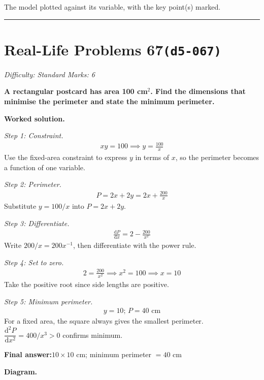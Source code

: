 \documentclass[11pt]{article}
\newcommand{\question}[1]{\par\medskip\noindent\textbf{#1}\par}
\begin{document}
\small The model plotted against its variable, with the key point(s) marked.\normalsize

\medskip\hrule

\section*{Real-Life Problems 67\quad\small\texttt{(d5-067)}}
\textit{Difficulty: Standard \quad\textbar\quad Marks: 6}

\question{A rectangular postcard has area 100 cm\(^2\). Find the dimensions that minimise the perimeter and state the minimum perimeter.}

\textbf{Worked solution.}

\textit{Step 1: Constraint.}
\[\begin{gathered}
xy = 100 \implies y = \frac{100}{x}
\end{gathered}\]
Use the fixed-area constraint to express \( y \) in terms of \( x \), so the perimeter becomes a function of one variable.

\textit{Step 2: Perimeter.}
\[\begin{gathered}
P = 2x + 2y = 2x + \frac{200}{x}
\end{gathered}\]
Substitute \( y = 100/x \) into \( P = 2x + 2y \).

\textit{Step 3: Differentiate.}
\[\begin{gathered}
\frac{\mathrm{d}P}{\mathrm{d}x} = 2 - \frac{200}{x^2}
\end{gathered}\]
Write \( 200/x = 200 x^{-1} \), then differentiate with the power rule.

\textit{Step 4: Set to zero.}
\[\begin{gathered}
2 = \frac{200}{x^2} \implies x^2 = 100 \implies x = 10
\end{gathered}\]
Take the positive root since side lengths are positive.

\textit{Step 5: Minimum perimeter.}
\[\begin{gathered}
y = 10; \, P = 40 \text{ cm}
\end{gathered}\]
For a fixed area, the square always gives the smallest perimeter. \( \dfrac{\mathrm{d}^2 P}{\mathrm{d}x^2} = 400/x^3 > 0 \) confirms minimum.

\begin{answerbox}
\textbf{Final answer:}\quad \(\displaystyle  10 \times 10 \) cm; minimum perimeter \(\displaystyle  = 40 \) cm
\end{answerbox}
\textbf{Diagram.}
\end{document}
